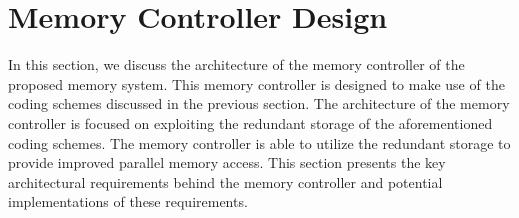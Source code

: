 \section{Memory Controller Design}
\label{sec:memcontrol}
In this section, we discuss the architecture of the memory controller of the proposed memory system. This memory controller is designed to make use of the coding schemes discussed in the previous section. The architecture of the memory controller is focused on exploiting the redundant storage of the aforementioned coding schemes. The memory controller is able to utilize the redundant storage to provide improved parallel memory access. This section presents the key architectural requirements behind the memory controller and potential implementations of these requirements.

